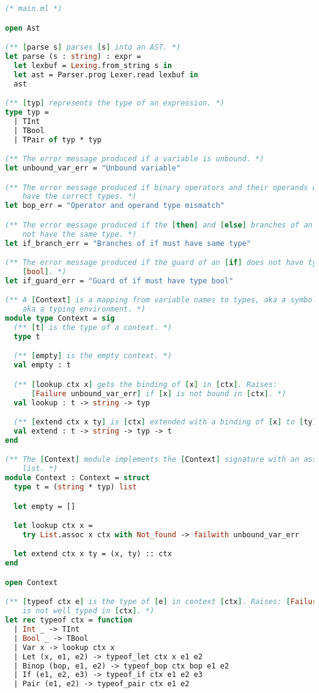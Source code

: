 \begin{lstlisting}[language=OCaml]
(* main.ml *)

open Ast

(** [parse s] parses [s] into an AST. *)
let parse (s : string) : expr =
  let lexbuf = Lexing.from_string s in
  let ast = Parser.prog Lexer.read lexbuf in
  ast

(** [typ] represents the type of an expression. *)
type typ =
  | TInt
  | TBool
  | TPair of typ * typ

(** The error message produced if a variable is unbound. *)
let unbound_var_err = "Unbound variable"

(** The error message produced if binary operators and their operands do not
    have the correct types. *)
let bop_err = "Operator and operand type mismatch"

(** The error message produced if the [then] and [else] branches of an [if] do
    not have the same type. *)
let if_branch_err = "Branches of if must have same type"

(** The error message produced if the guard of an [if] does not have type
    [bool]. *)
let if_guard_err = "Guard of if must have type bool"

(** A [Context] is a mapping from variable names to types, aka a symbol table,
    aka a typing environment. *)
module type Context = sig
  (** [t] is the type of a context. *)
  type t

  (** [empty] is the empty context. *)
  val empty : t

  (** [lookup ctx x] gets the binding of [x] in [ctx]. Raises:
      [Failure unbound_var_err] if [x] is not bound in [ctx]. *)
  val lookup : t -> string -> typ

  (** [extend ctx x ty] is [ctx] extended with a binding of [x] to [ty]. *)
  val extend : t -> string -> typ -> t
end

(** The [Context] module implements the [Context] signature with an association
    list. *)
module Context : Context = struct
  type t = (string * typ) list

  let empty = []

  let lookup ctx x =
    try List.assoc x ctx with Not_found -> failwith unbound_var_err

  let extend ctx x ty = (x, ty) :: ctx
end

open Context

(** [typeof ctx e] is the type of [e] in context [ctx]. Raises: [Failure] if [e]
    is not well typed in [ctx]. *)
let rec typeof ctx = function
  | Int _ -> TInt
  | Bool _ -> TBool
  | Var x -> lookup ctx x
  | Let (x, e1, e2) -> typeof_let ctx x e1 e2
  | Binop (bop, e1, e2) -> typeof_bop ctx bop e1 e2
  | If (e1, e2, e3) -> typeof_if ctx e1 e2 e3
  | Pair (e1, e2) -> typeof_pair ctx e1 e2


\end{lstlisting}
